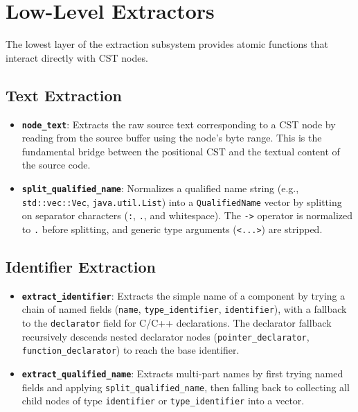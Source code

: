 \section{Low-Level Extractors}
\label{sec:extractors}

The lowest layer of the extraction subsystem provides atomic
functions that interact directly with CST nodes.

\subsection{Text Extraction}

\begin{itemize}
  \item \textbf{\texttt{node\_text}}: Extracts the raw source text
    corresponding to a CST node by reading from the source buffer
    using the node's byte range. This is the fundamental bridge
    between the positional CST and the textual content of the source code.
  \item \textbf{\texttt{split\_qualified\_name}}: Normalizes a
    qualified name string (e.g., \texttt{std::vec::Vec},
    \texttt{java.util.List}) into a \texttt{QualifiedName} vector by
    splitting on separator characters (\texttt{:}, \texttt{.}, and
    whitespace). The \texttt{->} operator is normalized to \texttt{.}
    before splitting, and generic type arguments (\texttt{<...>}) are stripped.
\end{itemize}

\subsection{Identifier Extraction}

\begin{itemize}
  \item \textbf{\texttt{extract\_identifier}}: Extracts the simple
    name of a component by trying a chain of named fields
    (\texttt{name}, \texttt{type\_identifier}, \texttt{identifier}),
    with a fallback to the \texttt{declarator} field for C/C++
    declarations. The declarator fallback recursively descends nested
    declarator nodes (\texttt{pointer\_declarator},
    \texttt{function\_declarator}) to reach the base identifier.
  \item \textbf{\texttt{extract\_qualified\_name}}: Extracts
    multi-part names by first trying named fields and applying
    \texttt{split\_qualified\_name}, then falling back to collecting
    all child nodes of type \texttt{identifier} or
    \texttt{type\_identifier} into a vector.
\end{itemize}

